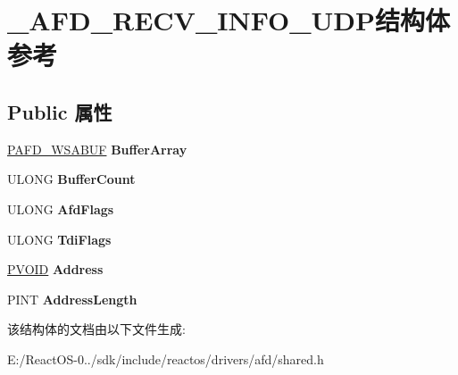 \hypertarget{struct___a_f_d___r_e_c_v___i_n_f_o___u_d_p}{}\section{\+\_\+\+A\+F\+D\+\_\+\+R\+E\+C\+V\+\_\+\+I\+N\+F\+O\+\_\+\+U\+D\+P结构体 参考}
\label{struct___a_f_d___r_e_c_v___i_n_f_o___u_d_p}
\subsection*{Public 属性}
\begin{DoxyCompactItemize}
\item 
\mbox{\label{struct___a_f_d___r_e_c_v___i_n_f_o___u_d_p_af7f55a4fda24374d33f4cae28b5b257e}} 
\hyperlink{struct___a_f_d___w_s_a_b_u_f}{P\+A\+F\+D\+\_\+\+W\+S\+A\+B\+UF} {\bfseries Buffer\+Array}
\item 
\mbox{\label{struct___a_f_d___r_e_c_v___i_n_f_o___u_d_p_a2821b0d9e9b289738c91d9928dbfa8ae}} 
U\+L\+O\+NG {\bfseries Buffer\+Count}
\item 
\mbox{\label{struct___a_f_d___r_e_c_v___i_n_f_o___u_d_p_a0b0f718baee384a5d9d35bd4324a699b}} 
U\+L\+O\+NG {\bfseries Afd\+Flags}
\item 
\mbox{\label{struct___a_f_d___r_e_c_v___i_n_f_o___u_d_p_af5acd98eca784470b3994a6c68d876f4}} 
U\+L\+O\+NG {\bfseries Tdi\+Flags}
\item 
\mbox{\label{struct___a_f_d___r_e_c_v___i_n_f_o___u_d_p_ac34173552976f21e05afc7b1f54ff367}} 
\hyperlink{interfacevoid}{P\+V\+O\+ID} {\bfseries Address}
\item 
\mbox{\label{struct___a_f_d___r_e_c_v___i_n_f_o___u_d_p_a27718b0a2ed90d3860d879c15d0536f7}} 
P\+I\+NT {\bfseries Address\+Length}
\end{DoxyCompactItemize}


该结构体的文档由以下文件生成\+:\begin{DoxyCompactItemize}
\item 
E\+:/\+React\+O\+S-\/0../sdk/include/reactos/drivers/afd/shared.\+h\end{DoxyCompactItemize}
